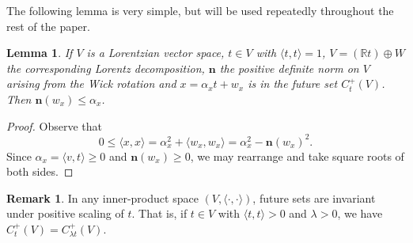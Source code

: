 \documentclass[a4paper,11pt]{article}
\numberwithin{equation}{section}
\theoremstyle{definition}
\newtheorem{Remark}[Definition]{Remark}
\theoremstyle{plain}
\newtheorem{Lemma}[Definition]{Lemma}
\newcommand{\R}{\mathbb R}
\newcommand{\inner}[2]{\langle #1, #2 \rangle}
\begin{document}
The following lemma is very simple, but will be used repeatedly throughout the rest of the paper. 
\begin{Lemma}\label{Lemma: alpha positive on future}
     If $V$ is a Lorentzian vector space, $t \in V$ with $\inner{t}{t} = 1$, $V = (\R t) \oplus W$ the corresponding Lorentz decomposition, $\mathbf{n}$ the positive definite norm on $V$ arising from the Wick rotation and $x = \alpha_x t + w_x$ is in the future set $C_{t}^{+}(V)$. Then $\mathbf{n}(w_{x}) \leq \alpha_{x}$.
\end{Lemma}

\begin{proof}
    Observe that
    $$0 \leq \inner{x}{x} = \alpha_{x}^{2} + \inner{w_{x}}{w_{x}} = \alpha_{x}^{2} - \mathbf{n}(w_{x})^{2}.$$
    Since $\alpha_{x} = \inner{v}{t} \geq 0$ and $\mathbf{n}(w_{x}) \geq 0$, we may rearrange and take square roots of both sides.
\end{proof}

\begin{Remark}
    In any inner-product space $(V, \inner{\cdot}{\cdot})$, future sets are invariant under positive scaling of $t$. That is, if $t \in V$ with $\inner{t}{t} > 0$ and $\lambda > 0$, we have $C^{+}_{t}(V) = C^{+}_{\lambda t}(V)$. 
\end{Remark}
\end{document}
